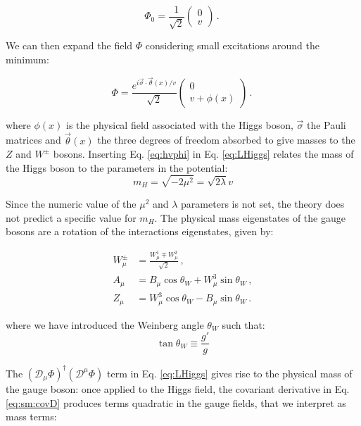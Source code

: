 \begin{equation}
	\Phi_0 = \frac{1}{\sqrt{2}} \left( \begin{array}{c} 0 \\ v  \end{array} \right) \, . \
\label{eq:hvphi}
\end{equation}

We can then expand the field $\Phi$ considering small excitations around the minimum:

\begin{equation}
	\Phi = \frac{e^{i \vec{\sigma} \cdot \vec{\theta}(x)/v }}{\sqrt{2}} \left( \begin{array}{c} 0 \\ v + \phi(x) \end{array} \right) \, . \
\label{eq:hvphi}
\end{equation}

\noindent where $\phi(x)$ is the physical field associated with the Higgs boson, $\vec{\sigma}$ the Pauli matrices and $\vec{\theta}(x)$ the three degrees of freedom absorbed to give masses to the $Z$ and $W^\pm$ bosons. Inserting Eq. \ref{eq:hvphi} in Eq. \ref{eq:LHiggs} relates the mass of the Higgs boson to the parameters in the potential:
\begin{equation}
m_H = \sqrt{- 2 \mu^2} = \sqrt{2 \lambda} v
\label{eq:sm:Higgsmass}
\end{equation}

Since the numeric value of the $\mu^2$ and $\lambda$ parameters is not set, the theory does not predict a specific value for $m_H$. 
The physical mass eigenstates of the gauge bosons are a rotation of the interactions eigenstates, given by:

\begin{equation}
\begin{aligned}
W_\mu^\pm &= \frac{W_\mu^1 \mp W_\mu^2}{\sqrt{2}} \, , \\
A_\mu &= B_\mu \cos\theta_W + W^3_\mu \sin\theta_W \, ,  \\
Z_\mu &= W^3_\mu \cos\theta_W - B_\mu \sin\theta_W \, .
\end{aligned}
\label{eq:wein}
\end{equation}

\noindent where we have introduced the Weinberg angle $\theta_W$ such that:
\begin{equation}
\tan\theta_W \equiv \frac{g'}{g}
\end{equation}


The $(\mathcal{D}_{\mu} \Phi)^{\dagger} (\mathcal{D}^{\mu} \Phi)$ term in Eq. \ref{eq:LHiggs} gives rise to the physical mass of the gauge boson: once applied to the Higgs field, the covariant derivative in Eq. \ref{eq:sm:covD} produces terms quadratic in the gauge fields, that we interpret as mass terms:

